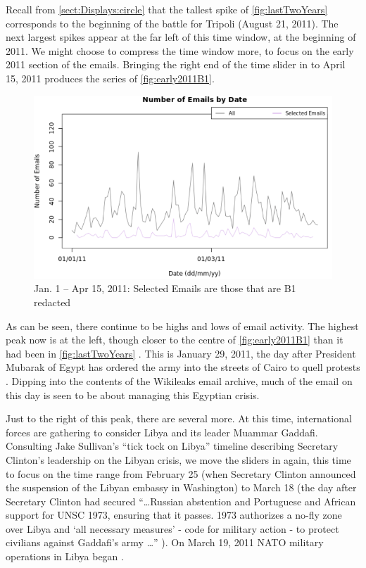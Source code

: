 \documentclass[journal]{vgtc}                %
\begin{document}
Recall from \autoref{sect:Displays:circle} that the tallest spike of \autoref{fig:lastTwoYears} corresponds to the beginning of the battle for Tripoli (August 21, 2011).   The next largest spikes appear at the far left of this time window, at the beginning of 2011.  We might choose to compress the time window more, to focus on the early 2011 section of the emails.  Bringing the right end of the time slider in to April 15, 2011 produces the series of \autoref{fig:early2011B1}.
\begin{figure}[h]
\begin{center}
\includegraphics[width=0.95\linewidth]{EmailVolumeB1JanApril2011}
\caption{Jan. 1 -- Apr 15, 2011:  Selected Emails are those that are B1 redacted}
\label{fig:early2011B1}
\end{center}
\end{figure}

As can be seen, there continue to be highs and lows of email activity.   The highest peak now is at the left, though closer to the centre of \autoref{fig:early2011B1} than it had been in \autoref{fig:lastTwoYears} .  This is January 29, 2011, the day after President Mubarak of Egypt has ordered the army into the streets of Cairo to quell protests \cite{cairoTanks2011, cairoResponse2011}.  Dipping into the contents of the Wikileaks email archive, much of the email on this day is seen to be about managing this Egyptian crisis.  

Just to the right of this peak, there are several more.   At this time, international forces are gathering to consider Libya and its leader Muammar Gaddafi.  Consulting Jake Sullivan's ``tick tock on Libya'' timeline describing Secretary Clinton's leadership on the Libyan crisis, we move the sliders in again, this time to focus on the time range from February 25 (when Secretary Clinton announced the suspension of the Libyan embassy in Washington) to March 18 (the day after Secretary Clinton had secured ``\ldots Russian abstention and Portuguese and African support for UNSC 1973, ensuring that  it passes. 1973 authorizes a no-fly zone over Libya and `all necessary measures' - code for military action - to protect civilians against Gaddafi's army \ldots'' \cite{tickTockLibya}).  On March 19, 2011 NATO military operations in Libya began \cite{LibyaTimelineWiki}.
\end{document}
